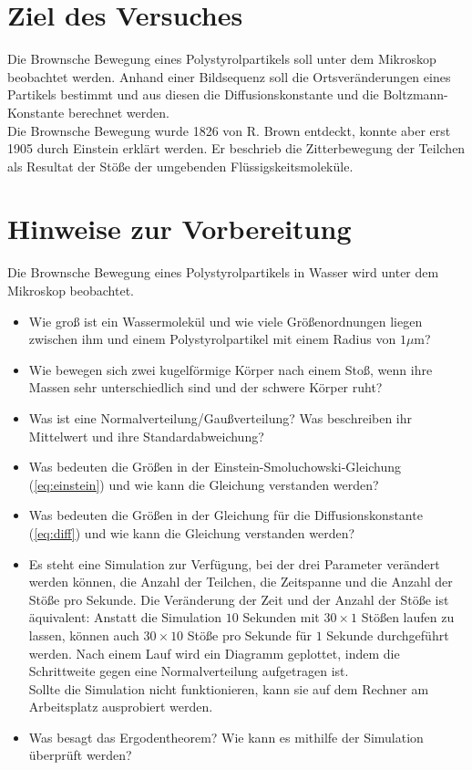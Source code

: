\section*{Ziel des Versuches}

Die Brownsche Bewegung eines Polystyrolpartikels soll unter dem Mikroskop beobachtet werden. Anhand einer Bildsequenz soll die Ortsveränderungen eines Partikels bestimmt und aus diesen die Diffusionskonstante und die Boltzmann-Konstante berechnet werden.\\
Die Brownsche Bewegung wurde 1826 von R. Brown entdeckt, konnte aber erst 1905 durch Einstein erklärt werden. Er beschrieb die Zitterbewegung der Teilchen als Resultat der Stöße der umgebenden Flüssigskeitsmoleküle.

\section*{Hinweise zur Vorbereitung}
Die Brownsche Bewegung eines Polystyrolpartikels in Wasser wird unter dem Mikroskop beobachtet.
\begin{itemize}
  \item Wie groß ist ein Wassermolekül und wie viele Größenordnungen liegen zwischen ihm und einem Polystyrolpartikel mit einem Radius von $1 \mu$m?
  \item Wie bewegen sich zwei kugelförmige Körper nach einem Stoß, wenn ihre Massen sehr unterschiedlich sind und der schwere Körper ruht?
  \item Was ist eine Normalverteilung/Gaußverteilung? Was beschreiben ihr Mittelwert und ihre Standardabweichung?
  \item Was bedeuten die Größen in der Einstein-Smoluchowski-Gleichung (\ref{eq:einstein}) und wie kann die Gleichung verstanden werden?
  \item Was bedeuten die Größen in der Gleichung für die Diffusionskonstante (\ref{eq:diff}) und wie kann die Gleichung verstanden werden?
  \item Es steht eine Simulation zur Verfügung, bei der drei Parameter verändert werden können, die Anzahl der Teilchen, die Zeitspanne und die Anzahl der Stöße pro Sekunde. Die Veränderung der Zeit und der Anzahl der Stöße ist äquivalent: Anstatt die Simulation $10$ Sekunden mit $30\times1$ Stößen laufen zu lassen, können auch $30\times10$ Stöße pro Sekunde für $1$ Sekunde durchgeführt werden. Nach einem Lauf wird ein Diagramm geplottet, indem die Schrittweite gegen eine Normalverteilung aufgetragen ist.\\
  Sollte die Simulation nicht funktionieren, kann sie auf dem Rechner am Arbeitsplatz ausprobiert werden.
  \item Was besagt das Ergodentheorem? Wie kann es mithilfe der Simulation überprüft werden?
\end{itemize}
